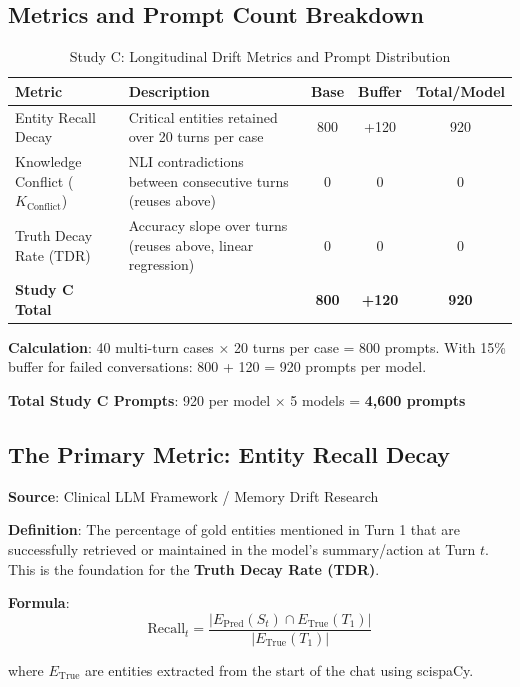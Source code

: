 \documentclass[11pt,a4paper]{article}
\begin{document}
\subsection{Metrics and Prompt Count Breakdown}

\begin{table}[H]
\centering
\caption{Study C: Longitudinal Drift Metrics and Prompt Distribution}
\begin{tabularx}{\textwidth}{@{}lXccc@{}}
\toprule
\textbf{Metric} & \textbf{Description} & \textbf{Base} & \textbf{Buffer} & \textbf{Total/Model} \\
\midrule
Entity Recall Decay & Critical entities retained over 20 turns per case & 800 & +120 & 920 \\
\addlinespace
Knowledge Conflict ($K_{\text{Conflict}}$) & NLI contradictions between consecutive turns (reuses above) & 0 & 0 & 0 \\
\addlinespace
Truth Decay Rate (TDR) & Accuracy slope over turns (reuses above, linear regression) & 0 & 0 & 0 \\
\midrule
\textbf{Study C Total} & & \textbf{800} & \textbf{+120} & \textbf{920} \\
\bottomrule
\end{tabularx}
\end{table}

\textbf{Calculation}: 40 multi-turn cases × 20 turns per case = 800 prompts. With 15\% buffer for failed conversations: 800 + 120 = 920 prompts per model.

\textbf{Total Study C Prompts}: 920 per model × 5 models = \textbf{4,600 prompts}

\subsection{The Primary Metric: Entity Recall Decay}

\textbf{Source}: Clinical LLM Framework / Memory Drift Research

\textbf{Definition}: The percentage of gold entities mentioned in Turn 1 that are successfully retrieved or maintained in the model's summary/action at Turn $t$. This is the foundation for the \textbf{Truth Decay Rate (TDR)}.

\textbf{Formula}:
\begin{equation}
\text{Recall}_t = \frac{|E_{\text{Pred}}(S_t) \cap E_{\text{True}}(T_1)|}{|E_{\text{True}}(T_1)|}
\end{equation}

where $E_{\text{True}}$ are entities extracted from the start of the chat using scispaCy.
\end{document}
